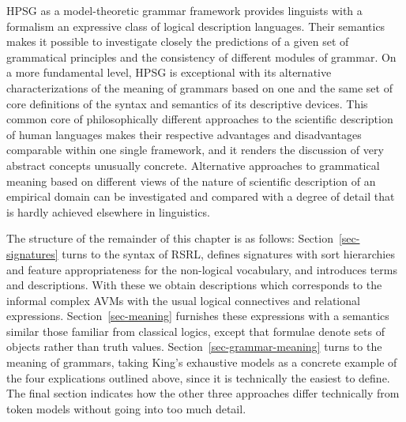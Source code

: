 \documentclass[output=paper
                ,modfonts
                ,nonflat
	        ,collection
	        ,collectionchapter
	        ,collectiontoclongg
 	        ,biblatex
                ,babelshorthands
                ,newtxmath
                ,draftmode
                ,colorlinks, citecolor=brown
]{./langsci/langscibook}
\begin{document}
{{HPSG as a model-theoretic grammar framework provides linguists
with a formalism an expressive class of logical description languages. Their
semantics makes it possible to investigate closely the predictions of
a given set of grammatical principles and the consistency of different
modules of grammar. On a more fundamental level, HPSG is exceptional with its
alternative characterizations of the meaning of grammars based on one
and the same set of core definitions of the syntax and semantics of
its descriptive devices. This common core of philosophically different
approaches to the scientific description of human languages makes their
respective advantages and disadvantages comparable within one single
framework, and it renders the discussion of very abstract concepts
unusually concrete.  Alternative approaches to grammatical meaning
based on different views of the nature of scientific description of an
empirical domain can be investigated and compared with a degree of
detail that is hardly achieved elsewhere in linguistics.




The structure of the remainder of this chapter is as follows:
Section~\ref{sec-signatures} turns to the syntax of RSRL, defines
signatures with sort hierarchies and feature appropriateness for the
non-logical vocabulary, and introduces terms and descriptions. With
these we obtain descriptions which corresponds to the informal complex
AVMs with the usual logical connectives and relational
expressions. Section~\ref{sec-meaning} furnishes these expressions
with a semantics similar those familiar from classical logics, except
that formulae denote sets of objects rather than truth
values. Section~\ref{sec-grammar-meaning} turns to the meaning of
grammars, taking King's exhaustive models as a concrete example of the four
explications outlined above, since it is technically the easiest to define.
The final section indicates how the other three approaches differ technically
from token models without going into too much detail.



}}
\end{document}
